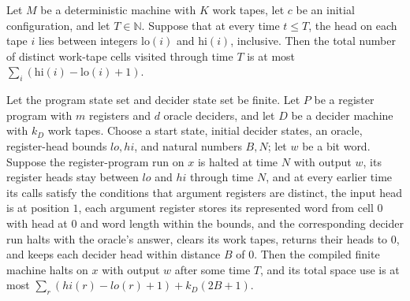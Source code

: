 \begin{theorem}
\label{Complexity.LogProg.spaceUsed_le_of_ranges}
\leanok
{}
Let $M$ be a deterministic machine with $K$ work tapes, let $c$ be an initial
configuration, and let $T\in\mathbb N$. Suppose that at every time $t\le T$, the head on
each tape $i$ lies between integers $\mathrm{lo}(i)$ and $\mathrm{hi}(i)$, inclusive.
Then the total number of distinct work-tape cells visited through time $T$ is at most
$\sum_i (\mathrm{hi}(i)-\mathrm{lo}(i)+1)$.
\end{theorem}

\begin{theorem}
\label{Complexity.LogProg.compile_space}
\leanok
{}
Let the program state set and decider state set be finite. Let $P$ be a register program
with $m$ registers and $d$ oracle deciders, and let $D$ be a decider machine with $k_D$
work tapes. Choose a start state, initial decider states, an oracle, register-head
bounds $lo,hi$, and natural numbers $B,N$; let $w$ be a bit word. Suppose the
register-program run on $x$ is halted at time $N$ with output $w$, its register heads
stay between $lo$ and $hi$ through time $N$, and at every earlier time its calls satisfy
the conditions that argument registers are distinct, the input head is at position $1$,
each argument register stores its represented word from cell $0$ with head at $0$ and
word length within the bounds, and the corresponding decider run halts with the oracle's
answer, clears its work tapes, returns their heads to $0$, and keeps each decider head
within distance $B$ of $0$. Then the compiled finite machine halts on $x$ with output
$w$ after some time $T$, and its total space use is at most $\sum_r (hi(r)-lo(r)+1) +
k_D(2B+1)$.
\end{theorem}

